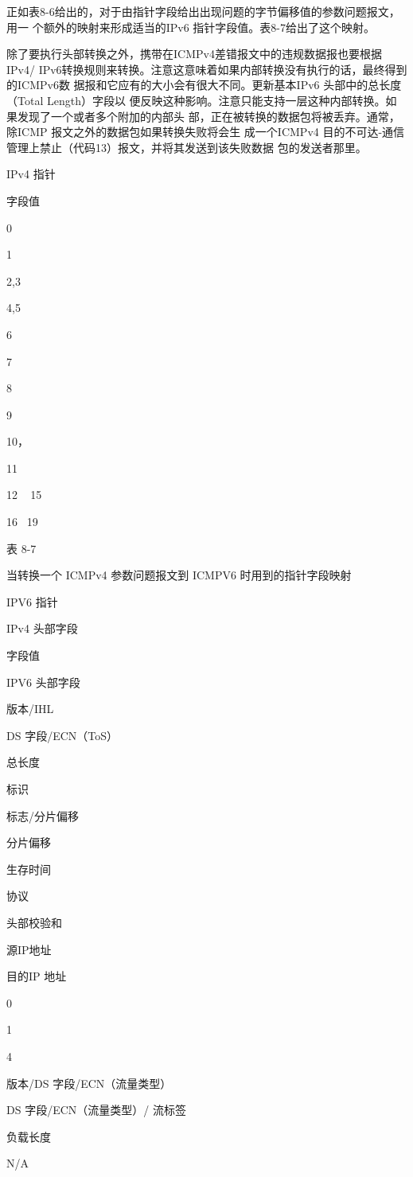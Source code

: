 正如表8-6给出的，对于由指针字段给出出现问题的字节偏移值的参数问题报文，用一
个额外的映射来形成适当的IPv6 指针字段值。表8-7给出了这个映射。

除了要执行头部转换之外，携带在ICMPv4差错报文中的违规数据报也要根据IPv4/
IPv6转换规则来转换。注意这意味着如果内部转换没有执行的话，最终得到的ICMPv6数
据报和它应有的大小会有很大不同。更新基本IPv6 头部中的总长度（Total Length）字段以
便反映这种影响。注意只能支持一层这种内部转换。如果发现了一个或者多个附加的内部头
部，正在被转换的数据包将被丢弃。通常，除ICMP 报文之外的数据包如果转换失败将会生
成一个ICMPv4 目的不可达-通信管理上禁止（代码13）报文，并将其发送到该失败数据
包的发送者那里。

IPv4 指针

字段值

0

1

2,3

4,5

6

7

8

9

10，

11

12 ~ 15

16~ 19

表 8-7

当转换一个 ICMPv4 参数问题报文到 ICMPV6 时用到的指针字段映射

IPV6 指针

IPv4 头部字段

字段值

IPV6 头部字段

版本/IHL

DS 字段/ECN（ToS）

总长度

标识

标志/分片偏移

分片偏移

生存时间

协议

头部校验和

源IP地址

目的IP 地址

0

1

4

版本/DS 字段/ECN（流量类型）

DS 字段/ECN（流量类型）/ 流标签

负载长度

N/A

